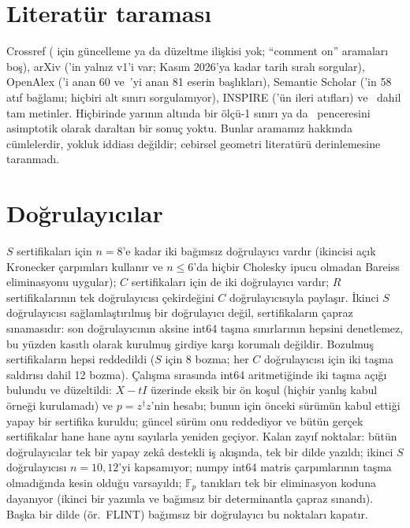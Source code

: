 \documentclass[aps,pra,onecolumn,superscriptaddress,nofootinbib,longbibliography,10pt]{revtex4-2}
\theoremstyle{definition}
\newcommand{\FF}{\mathbb F}
\begin{document}
\appendix
\section{Literatür taraması}\label{app:search}
Crossref (\cite{JL05} için güncelleme ya da düzeltme ilişkisi yok; ``comment on'' aramaları boş), arXiv (\cite{JL05}'in yalnız v1'i var; Kasım 2026'ya kadar tarih sıralı sorgular), OpenAlex (\cite{JL05}'i anan 60 ve~\cite{LW02}'yi anan 81 eserin başlıkları), Semantic Scholar (\cite{JL05}'in 58 atıf bağlamı; hiçbiri alt sınırı sorgulamıyor), INSPIRE (\cite{SC23,JL05,HG16,KJTV19,WHG17,ZSZ24}'ün ileri atıfları) ve~\cite{Wyd20,Hub17,CDJJKSZ13,YSCZ26} dahil tam metinler. Hiçbirinde yarının altında bir ölçü-1 sınırı ya da~\cite{LW02} penceresini asimptotik olarak daraltan bir sonuç yoktu. Bunlar aramamız hakkında cümlelerdir, yokluk iddiası değildir; cebirsel geometri literatürü derinlemesine taranmadı.


\section{Doğrulayıcılar}\label{app:ver}
$S$ sertifikaları için $n=8$'e kadar iki bağımsız doğrulayıcı vardır (ikincisi açık Kronecker çarpımları kullanır ve $n\le6$'da hiçbir Cholesky ipucu olmadan Bareiss eliminasyonu uygular); $C$ sertifikaları için de iki doğrulayıcı vardır; $R$ sertifikalarının tek doğrulayıcısı çekirdeğini $C$ doğrulayıcısıyla paylaşır. İkinci $S$ doğrulayıcısı sağlamlaştırılmış bir doğrulayıcı değil, sertifikaların çapraz sınamasıdır: son doğrulayıcının aksine int64 taşma sınırlarının hepsini denetlemez, bu yüzden kasıtlı olarak kurulmuş girdiye karşı korumalı değildir. Bozulmuş sertifikaların hepsi reddedildi ($S$ için 8 bozma; her $C$ doğrulayıcısı için iki taşma saldırısı dahil 12 bozma). Çalışma sırasında int64 aritmetiğinde iki taşma açığı bulundu ve düzeltildi: $X-tI$ üzerinde eksik bir ön koşul (hiçbir yanlış kabul örneği kurulamadı) ve $p=z^\dagger z$'nin hesabı; bunun için önceki sürümün kabul ettiği yapay bir sertifika kuruldu; güncel sürüm onu reddediyor ve bütün gerçek sertifikalar hane hane aynı sayılarla yeniden geçiyor. Kalan zayıf noktalar: bütün doğrulayıcılar tek bir yapay zekâ destekli iş akışında, tek bir dilde yazıldı; ikinci $S$ doğrulayıcısı $n=10{,}12$'yi kapsamıyor; numpy int64 matris çarpımlarının taşma olmadığında kesin olduğu varsayıldı; $\FF_p$ tanıkları tek bir eliminasyon koduna dayanıyor (ikinci bir yazımla ve bağımsız bir determinantla çapraz sınandı). Başka bir dilde (ör.\ FLINT) bağımsız bir doğrulayıcı bu noktaları kapatır.
\end{document}
